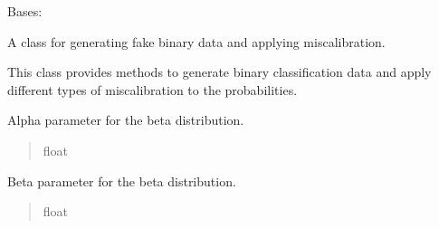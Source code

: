 \documentclass[letterpaper,10pt,english]{sphinxmanual}
\begin{document}
\begin{fulllineitems}
\label{\detokenize{calzone:calzone.utils.fake_binary_data_generator}}
\pysigstartsignatures
{}
\pysigstopsignatures
\sphinxAtStartPar
Bases: 

\sphinxAtStartPar
A class for generating fake binary data and applying miscalibration.

\sphinxAtStartPar
This class provides methods to generate binary classification data
and apply different types of miscalibration to the probabilities.

\begin{fulllineitems}
\label{\detokenize{calzone:calzone.utils.fake_binary_data_generator.alpha_val}}
\pysigstartsignatures
{}
\pysigstopsignatures
\sphinxAtStartPar
Alpha parameter for the beta distribution.
\begin{quote}\begin{description}
\sphinxAtStartPar
float

\end{description}\end{quote}

\end{fulllineitems}


\begin{fulllineitems}
\label{\detokenize{calzone:calzone.utils.fake_binary_data_generator.beta_val}}
\pysigstartsignatures
{}
\pysigstopsignatures
\sphinxAtStartPar
Beta parameter for the beta distribution.
\begin{quote}\begin{description}
\sphinxAtStartPar
float

\end{description}\end{quote}


\end{fulllineitems}
\end{fulllineitems}
\end{document}
